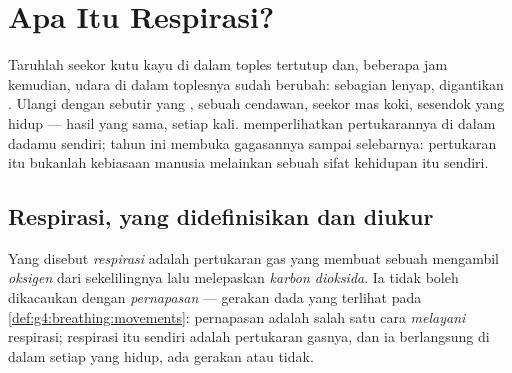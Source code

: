 \chapter{Apa Itu Respirasi?}\label{ch:g7:what-is-respiration}

Taruhlah seekor kutu kayu di dalam toples tertutup dan, beberapa jam
kemudian, udara di dalam toplesnya sudah berubah: sebagian 
lenyap, digantikan . Ulangi dengan sebutir  yang
, sebuah cendawan, seekor  mas koki, sesendok  yang
hidup --- hasil yang sama, setiap kali.
 memperlihatkan pertukarannya di
dalam dadamu sendiri; tahun ini membuka gagasannya sampai selebarnya:
pertukaran itu bukanlah kebiasaan manusia melainkan sebuah sifat
kehidupan itu sendiri.

\section{Respirasi, yang didefinisikan dan diukur}

\begin{definition}[Respirasi]\label{def:g7:what-is-respiration:respiration}
Yang disebut \emph{respirasi} adalah pertukaran gas
yang membuat sebuah  mengambil
\emph{oksigen} dari sekelilingnya lalu melepaskan
\emph{karbon dioksida}. Ia tidak boleh
dikacaukan dengan \emph{pernapasan} --- gerakan dada
yang terlihat pada \cref{def:g4:breathing:movements}: pernapasan
adalah salah satu cara \emph{melayani} respirasi; respirasi itu
sendiri adalah pertukaran gasnya, dan ia berlangsung di dalam setiap
 yang hidup, ada gerakan atau tidak.
\end{definition}

